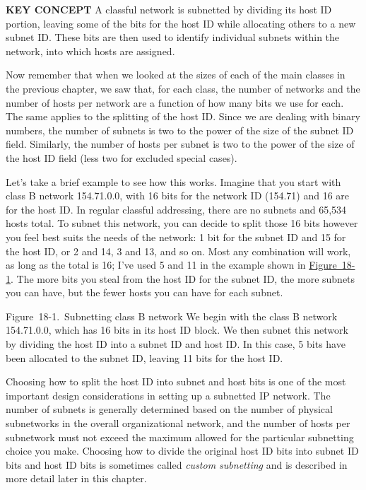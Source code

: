 {\textbf{KEY CONCEPT}} A classful network is subnetted by dividing its
host ID portion, leaving some of the bits for the host ID while
allocating others to a new subnet ID. These bits are then used to
identify individual subnets within the network, into which hosts are
assigned.

Now remember that when we looked at the sizes of each of the main
classes in the previous chapter, we saw that, for each class, the number
of networks and the number of hosts per network are a function of how
many bits we use for each. The same applies to the splitting of the host
ID. Since we are dealing with binary numbers, the number of subnets is
two to the power of the size of the subnet ID field. Similarly, the
number of hosts per subnet is two to the power of the size of the host
ID field (less two for excluded special cases).

Let's take a brief example to see how this works. Imagine that you start
with class B network 154.71.0.0, with 16 bits for the network ID
(154.71) and 16 are for the host ID. In regular classful addressing,
there are no subnets and 65,534 hosts total. To subnet this network, you
can decide to split those 16 bits however you feel best suits the needs
of the network: 1 bit for the subnet ID and 15 for the host ID, or 2 and
14, 3 and 13, and so on. Most any combination will work, as long as the
total is 16; I've used 5 and 11 in the example shown in
\protect\hyperlink{ch18s02.htmlux5cux23subnetting_class_b_network_we_begin_with}{Figure~18-1}.
The more bits you steal from the host ID for the subnet ID, the more
subnets you can have, but the fewer hosts you can have for each subnet.

\protect\hypertarget{ch18s02.htmlux5cux23subnetting_class_b_network_we_begin_with}{}{}

\protect\hypertarget{ch18s02.htmlux5cux23I_mediaobject4_d1e18151}{}{}

Figure~18-1.~Subnetting class B network We begin with the class B
network 154.71.0.0, which has 16 bits in its host ID block. We then
subnet this network by dividing the host ID into a subnet ID and host
ID. In this case, 5 bits have been allocated to the subnet ID, leaving
11 bits for the host ID.

Choosing how to split the host ID into subnet and host bits is one of
the most important design considerations in setting up a subnetted IP
network. The number of subnets is generally determined based on the
number of physical subnetworks in the overall organizational network,
and the number of hosts per subnetwork must not exceed the maximum
allowed for the particular subnetting choice you make. Choosing how to
divide the original host ID bits into subnet ID bits and host ID bits is
sometimes called {\emph{custom subnetting}} and is described in more
detail later in this chapter.



